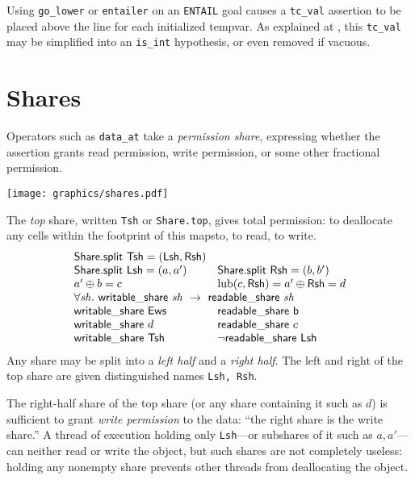 \documentclass[12pt,fleqn,openany,oneside,showtrims]{memoir}
\newcommand{\ychapter}[2]{\chapter[#1]{#1}}
\begin{document}
Using \lstinline{go_lower} or \lstinline{entailer} on
an \lstinline{ENTAIL} goal causes a
\lstinline{tc_val} assertion to be placed above the line
for each initialized tempvar.
As explained at ,
this \lstinline{tc_val} may be simplified into
an \lstinline{is_int} hypothesis, or even removed if vacuous.



\ychapter{Shares}{(See PLCC Chapters~\ref{ch:shares},\ref{ch:share-model})}
\label{refcard:shares}
Operators such as \lstinline{data_at} take a
\emph{permission share}, expressing whether
the assertion grants read permission, write permission,
or some other fractional permission.

\centerline{\texttt{[image: graphics/shares.pdf]}}

The \emph{top} share, written \lstinline{Tsh} or
\lstinline{Share.top}, gives total permission: to deallocate any cells
within the footprint of this mapsto, to read, to write.
\[
\begin{array}{ll}
\mathsf{Share.split}~\mathsf{Tsh} = (\mathsf{Lsh},\mathsf{Rsh}) & \\
\mathsf{Share.split}~\mathsf{Lsh} = (a,a')  & \mathsf{Share.split}~\mathsf{Rsh} = (b,b') \\
a'\oplus b = c & \mathrm{lub}(c,\mathsf{Rsh})=a'\oplus \mathsf{Rsh}=d\\
\multicolumn{2}{l}{\forall \mathit{sh}.~\mathsf{writable\_share}~\mathit{sh}~\rightarrow~\mathsf{readable\_share}~\mathit{sh}}\\
\mathsf{writable\_share}~\mathsf{Ews} & \mathsf{readable\_share}~\mathsf{b} \\
\mathsf{writable\_share}~d & \mathsf{readable\_share}~c \\
\mathsf{writable\_share}~\mathsf{Tsh} &  \neg \mathsf{readable\_share}~\mathsf{Lsh} \\
\end{array}
\]
Any share may be split into a \emph{left half} and a \emph{right half}.
The left and right of the top share are given distinguished names
\lstinline{Lsh, Rsh}.

The right-half share of the top share (or any share containing it such
as $d$) is sufficient to grant \emph{write permission} to the data:
``the right share is the write share.''  A thread of execution holding
only \lstinline{Lsh}---or subshares of it such as $a,a'$---can neither
read or write the object, but such shares are not completely useless:
holding any nonempty share prevents other threads from deallocating
the object.
\end{document}
